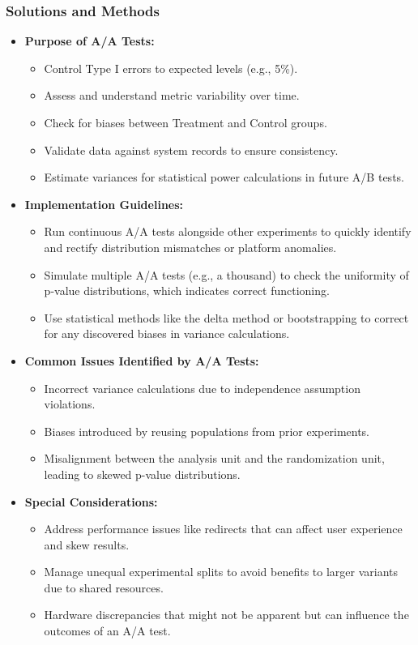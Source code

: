 \documentclass{article}
\begin{document}
\subsubsection*{Solutions and Methods}
\begin{itemize}
    \item \textbf{Purpose of A/A Tests:}
    \begin{itemize}
        \item Control Type I errors to expected levels (e.g., 5\%).
        \item Assess and understand metric variability over time.
        \item Check for biases between Treatment and Control groups.
        \item Validate data against system records to ensure consistency.
        \item Estimate variances for statistical power calculations in future A/B tests.
    \end{itemize}

    \item \textbf{Implementation Guidelines:}
    \begin{itemize}
        \item Run continuous A/A tests alongside other experiments to quickly identify and rectify distribution mismatches or platform anomalies.
        \item Simulate multiple A/A tests (e.g., a thousand) to check the uniformity of p-value distributions, which indicates correct functioning.
        \item Use statistical methods like the delta method or bootstrapping to correct for any discovered biases in variance calculations.
    \end{itemize}

    \item \textbf{Common Issues Identified by A/A Tests:}
    \begin{itemize}
        \item Incorrect variance calculations due to independence assumption violations.
        \item Biases introduced by reusing populations from prior experiments.
        \item Misalignment between the analysis unit and the randomization unit, leading to skewed p-value distributions.
    \end{itemize}

    \item \textbf{Special Considerations:}
    \begin{itemize}
        \item Address performance issues like redirects that can affect user experience and skew results.
        \item Manage unequal experimental splits to avoid benefits to larger variants due to shared resources.
        \item Hardware discrepancies that might not be apparent but can influence the outcomes of an A/A test.
    \end{itemize}
\end{itemize}
\end{document}
